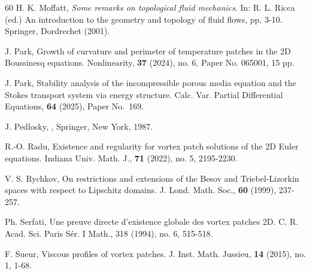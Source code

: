 \documentclass[reqno,11pt,a4paper]{amsart}
\begin{document}
\begin{thebibliography}{60}
H. K. Moffatt, {\it Some remarks on topological fluid mechanics}.
In: R. L. Ricca (ed.) An introduction to the geometry and topology of fluid flows, pp. 3-10.
Springer, Dordrechet (2001).

J. Park, 
Growth of curvature and perimeter of temperature patches in the 2D Boussinesq equations. 
Nonlinearity, \textbf{37} (2024), no. 6, Paper No. 065001, 15 pp.

J. Park,
Stability analysis of the incompressible porous media equation and the Stokes transport system via energy structure.
Calc. Var. Partial Differential Equations,
\textbf{64} (2025), Paper No.~169.

J. Pedlosky, , Springer, New York, 1987.

R.-O. Radu,
Existence and regularity for vortex patch solutions of the 2D Euler equations. 
Indiana Univ. Math. J., \textbf{71} (2022), no. 5, 2195-2230. 


V. S. Rychkov, 
On restrictions and extensions of the Besov and Triebel-Lizorkin spaces with respect to Lipschitz domains. 
J. Lond. Math. Soc., \textbf{60} (1999), 237-257.

Ph. Serfati, Une preuve directe d'existence globale des vortex patches 2D. 
C. R. Acad. Sci. Paris S\'er. I Math., \textrm{318} (1994), no. 6, 515-518.

F. Sueur, Viscous profiles of vortex patches.
J. Inst. Math. Jussieu, \textbf{14} (2015), no. 1, 1-68.


\end{thebibliography}
\end{document}
